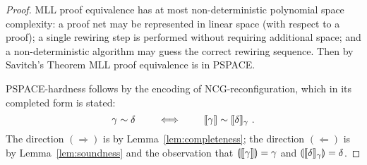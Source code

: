 \documentclass{sigplanconf-modified}
\let\capsabbrev=\uppercase
\begin{document}
\begin{proof}
\capsabbrev{mll} proof equivalence has at most non-deterministic polynomial space complexity: a proof net may be represented in linear space (with respect to a proof); a single rewiring step is performed without requiring additional space; and a non-deterministic algorithm may guess the correct rewiring sequence.
%
Then by Savitch's Theorem \cite{Savitch-1970} \capsabbrev{mll} proof equivalence is in \capsabbrev{pspace}.


\capsabbrev{pspace}-hardness follows by the encoding of \capsabbrev{ncg}-reconfiguration, which in its completed form is stated:
\[
	\gamma\perm\delta \qquad\iff\qquad \itn\gamma\perm\itn\delta_\gamma~.
\]
%
The direction $(\Rightarrow)$ is by Lemma~\ref{lem:completeness}; the direction $(\Leftarrow)$ is by Lemma~\ref{lem:soundness} and the observation that $\llparenthesis\llbracket\gamma\rrbracket\rrparenthesis=\gamma$ and $\llparenthesis\llbracket\delta\rrbracket_\gamma\rrparenthesis=\delta$.
%
\end{proof}





\end{document}
